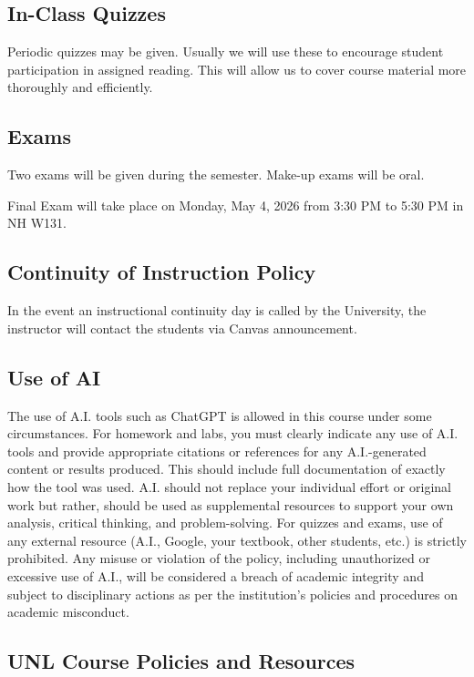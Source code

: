 \documentclass[10pt]{article}
\begin{document}
\subsection*{In-Class Quizzes}
Periodic quizzes may be given. Usually we will use these to encourage student participation in assigned reading. This will allow us to cover course material more thoroughly and efficiently.

\subsection*{Exams}
Two exams will be given during the semester. Make-up exams will be oral.

Final Exam will take place on Monday, May 4, 2026 from 3:30 PM to 5:30 PM in NH W131.

\subsection*{Continuity of Instruction Policy}

In the event an instructional continuity day is called by the University, the instructor will contact the students via Canvas announcement.

\subsection*{Use of AI}

The use of A.I. tools such as ChatGPT is allowed in this course under some circumstances. For homework and labs, you must clearly indicate any use of A.I. tools and provide appropriate citations or references for any A.I.-generated content or results produced. This should include full documentation of exactly how the tool was used. A.I. should not replace your individual effort or original work but rather, should be used as supplemental resources to support your own analysis, critical thinking, and problem-solving. For quizzes and exams, use of any external resource (A.I., Google, your textbook, other students, etc.) is strictly prohibited. Any misuse or violation of the policy, including unauthorized or excessive use of A.I., will be considered a breach of academic integrity and subject to disciplinary actions as per the institution's policies and procedures on academic misconduct.

\subsection*{UNL Course Policies and Resources}
\end{document}
